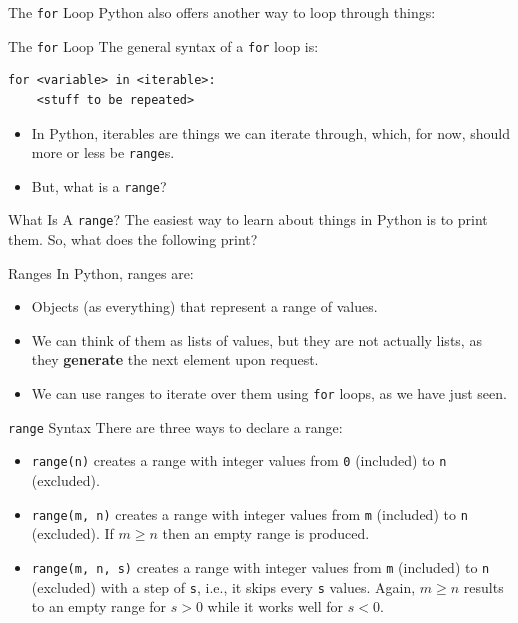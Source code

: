 \documentclass[aspectratio=169, 12pt, xcolor=table]{beamer}
\begin{document}
	\begin{frame}{The \texttt{for} Loop}
		Python also offers another way to loop through things:
		
	\end{frame}

	\begin{frame}[fragile]{The \texttt{for} Loop}
		The general syntax of a \texttt{for} loop is:
		\begin{verbatim}
for <variable> in <iterable>:
    <stuff to be repeated>
\end{verbatim}
		\begin{itemize}
			\item In Python, iterables are things we can iterate through, which, for now, should more or less be \texttt{range}s.
			\item But, what is a \texttt{range}?
		\end{itemize}
	\end{frame}

	\begin{frame}{What Is A \texttt{range}?}
		The easiest way to learn about things in Python is to print them. So, what does the following print?
		
	\end{frame}

	\begin{frame}{Ranges}
		In Python, ranges are:
		\begin{itemize}
			\item Objects (as everything) that represent a range of values.
			\item We can think of them as lists of values, but they are not actually lists, as they \textbf{generate} the next element upon request.
			\item We can use ranges to iterate over them using \texttt{for} loops, as we have just seen.
		\end{itemize}
	\end{frame}

	\begin{frame}{\texttt{range} Syntax}
		There are three ways to declare a range:
		\begin{itemize}
			\item \texttt{range(n)} creates a range with integer values from \texttt{0} (included) to \texttt{n} (excluded).
			\item \texttt{range(m, n)} creates a range with integer values from \texttt{m} (included) to \texttt{n} (excluded). If $m \geq n$ then an empty range is produced.
			\item \texttt{range(m, n, s)} creates a range with integer values from \texttt{m} (included) to \texttt{n} (excluded) with a step of \texttt{s}, i.e., it skips every \texttt{s} values. Again, $m\geq n$ results to an empty range for $s>0$ while it works well for $s<0$.
		\end{itemize}
	\end{frame}
\end{document}
